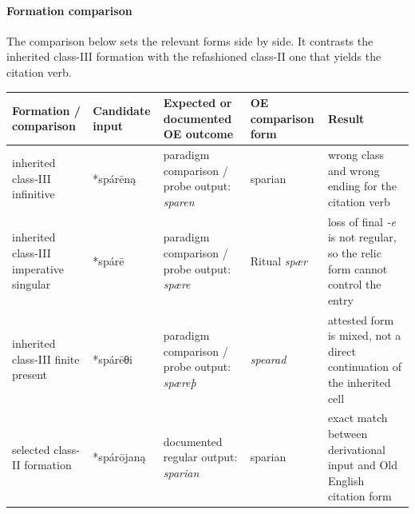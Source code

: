 \documentclass[
  british,
  a4paper,
]{article}
\newcounter{none} %
\begin{document}
\paragraph{Formation comparison}\label{formation-comparison-4}

The comparison below sets the relevant forms side by side. It contrasts
the inherited class-III formation with the refashioned class-II one that
yields the citation verb.

{\def\LTcaptype{none} %
\begin{longtable}[]{@{}
  >{\raggedright\arraybackslash}p{}
  >{\raggedright\arraybackslash}p{}
  >{\raggedright\arraybackslash}p{}
  >{\raggedright\arraybackslash}p{}
  >{\raggedright\arraybackslash}p{}@{}}
\toprule\noalign{}
\begin{minipage}[b]{\linewidth}\raggedright
Formation / comparison
\end{minipage} & \begin{minipage}[b]{\linewidth}\raggedright
Candidate input
\end{minipage} & \begin{minipage}[b]{\linewidth}\raggedright
Expected or documented OE outcome
\end{minipage} & \begin{minipage}[b]{\linewidth}\raggedright
OE comparison form
\end{minipage} & \begin{minipage}[b]{\linewidth}\raggedright
Result
\end{minipage} \\
\midrule\noalign{}
\endhead
\bottomrule\noalign{}
\endlastfoot
inherited class-III infinitive & *spárēną & paradigm comparison / probe
output: \emph{sparen} & sparian & wrong class and wrong ending for the
citation verb \\
inherited class-III imperative singular & *spárē & paradigm comparison /
probe output: \emph{spære} & Ritual \emph{spær} & loss of final
\emph{-e} is not regular, so the relic form cannot control the entry \\
inherited class-III finite present & *spárēθi & paradigm comparison /
probe output: \emph{spæreþ} & \emph{spearad} & attested form is mixed,
not a direct continuation of the inherited cell \\
selected class-II formation & *spárōjaną & documented regular output:
\emph{sparian} & sparian & exact match between derivational input and
Old English citation form \\
\end{longtable}
}
\end{document}
